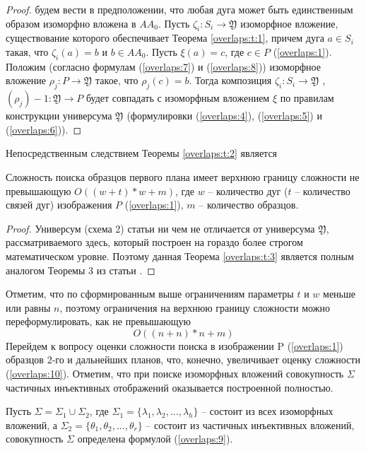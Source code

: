 \begin{proof}
будем вести в предположении, что любая дуга  может быть единственным образом изоморфно вложена в  $AA_0$. Пусть $\zeta_i : S_i  \to \mathfrak{Y}$ изоморфное вложение, существование которого  обеспечивает Теорема \ref{overlaps:t:1}, причем дуга $a \in S_i$ такая, что $\zeta_i (a) = b$  и   $b \in AA_0$.  Пусть $\xi(a) = c$,  где  $c \in P$  (\ref{overlaps:1}).  
Положим  (согласно формулам (\ref{overlaps:7})  и  (\ref{overlaps:8}))  изоморфное вложение $\rho_j : P \to \mathfrak{Y}$  такое, что  $\rho_j (c) = b$. Тогда   композиция  $\zeta_i : S_i \to \mathfrak{Y}$ , $(\rho_j)-1 : \mathfrak{Y} \to P$  будет  совпадать с  изоморфным вложением $\xi$ по правилам конструкции универсума  $\mathfrak{Y}$  (формулировки   (\ref{overlaps:4}), (\ref{overlaps:5}) и  (\ref{overlaps:6})).
\end{proof}

Непосредственным следствием Теоремы \ref{overlaps:t:2} является

\begin{theorem}
Сложность поиска образцов первого плана имеет верхнюю границу сложности не превышающую  $O((w+t)*w+m)$,  где  $w$ -- количество дуг ($t$ -- количество связей дуг) изображения  $P$  (\ref{overlaps:1}), $m$ -- количество образцов.
\label{overlaps:t:3}
\end{theorem}
\begin{proof}
Универсум (схема 2) статьи \cite{D8} ни чем не отличается от универсума  $\mathfrak{Y}$, рассматриваемого здесь, который построен на гораздо более строгом математическом уровне. Поэтому данная Теорема \ref{overlaps:t:3}  является полным аналогом Теоремы 3 из статьи \cite{D8}.
\end{proof}

Отметим, что по сформированным выше ограничениям параметры  $t$  и $w$  меньше или равны $n$,  поэтому  ограничения на верхнюю границу сложности можно переформулировать, как не превышающую  
\begin{equation}
O((n+n)*n+m)
\label{overlaps:10}
\end{equation}
Перейдем к вопросу оценки сложности поиска в  изображении  P  (\ref{overlaps:1})  образцов 2-го и дальнейших планов, что, конечно, увеличивает оценку сложности (\ref{overlaps:10}).  Отметим, что при поиске изоморфных вложений совокупность $\Sigma$ частичных инъективных отображений  оказывается построенной полностью.

Пусть $\Sigma = \Sigma_1 \cup \Sigma_2$, где $\Sigma_1  =  \{\lambda_1, \lambda_2 ,... , \lambda_h \}$ -- состоит из всех изоморфных вложений,  а  $\Sigma_2  =  \{\theta_1, \theta_2 ,..., \theta_r\}$ -- состоит из частичных инъективных вложений, совокупность  $\Sigma$  определена формулой (\ref{overlaps:9}).  

